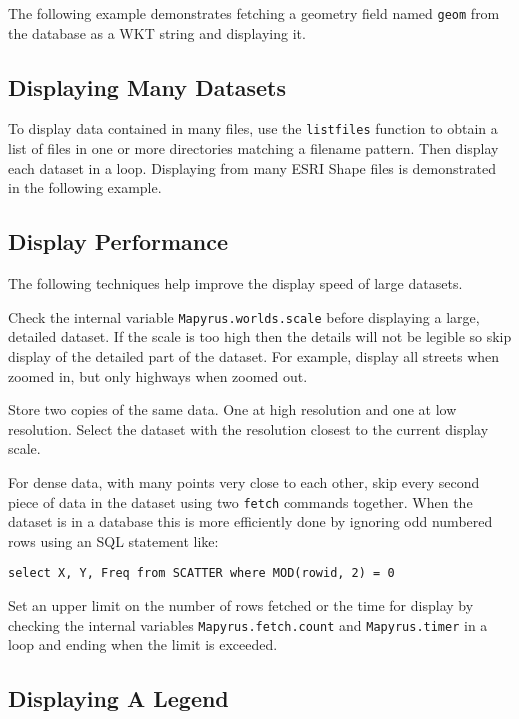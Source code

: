 The following example demonstrates fetching a geometry field named \texttt{geom}
from the database as a WKT string and displaying it.



\subsection{Displaying Many Datasets}

To display data contained in many files, use the \texttt{listfiles}
function to obtain a list of files in one or more directories matching
a filename pattern.  Then display each dataset in a loop.
Displaying from many ESRI Shape files is demonstrated in the following
example.



\subsection{Display Performance}

The following techniques help improve the display speed of large datasets.

Check the internal variable \texttt{Mapyrus.worlds.scale} before displaying a
large, detailed dataset.  If the scale is too high then the details will not be
legible so skip display of the detailed part of the dataset.  For example,
display all streets when zoomed in, but only highways when zoomed out.

Store two copies of the same data.  One at high resolution and one at low
resolution.  Select the dataset with the resolution closest to the current
display scale.

For dense data, with many points very close to each other, skip every second
piece of data in the dataset using two \texttt{fetch} commands together.  When
the dataset is in a database this is more efficiently done by ignoring odd
numbered rows using an SQL statement like:

\begin{verbatim}
select X, Y, Freq from SCATTER where MOD(rowid, 2) = 0
\end{verbatim}

Set an upper limit on the number of rows fetched or the time for display by
checking the internal variables \texttt{Mapyrus.fetch.count} and
\texttt{Mapyrus.timer} in a loop and ending when the limit is exceeded.

\subsection{Displaying A Legend}


